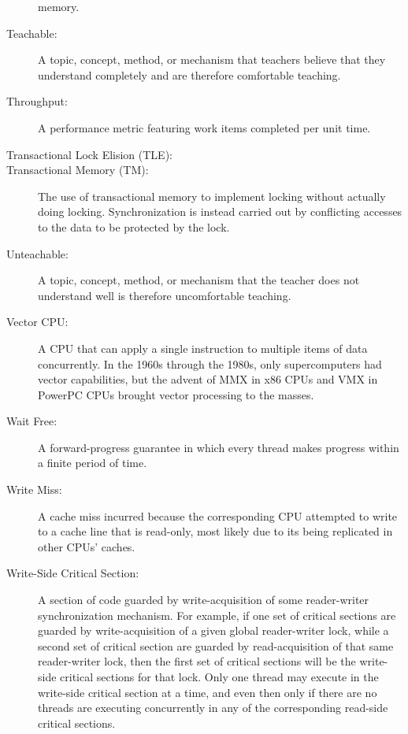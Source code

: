 \begin{description}
	memory.
\item[Teachable:]
	A topic, concept, method, or mechanism that teachers believe that
	they understand completely and are therefore comfortable teaching.
\item[Throughput:]
	A performance metric featuring work items completed per unit time.
\item[Transactional Lock Elision (TLE):]
\item[Transactional Memory (TM):]
	The use of transactional memory to implement locking without
	actually doing locking.
	Synchronization is instead carried out by conflicting accesses
	to the data to be protected by the lock.
\item[Unteachable:]
	A topic, concept, method, or mechanism that the teacher does
	not understand well is therefore uncomfortable teaching.
\item[Vector CPU:]
	A CPU that can apply a single instruction to multiple items of
	data concurrently.
	In the 1960s through the 1980s, only supercomputers had vector
	capabilities, but the advent of MMX in x86 CPUs and VMX in
	PowerPC CPUs brought vector processing to the masses.
\item[Wait Free:]
	A forward-progress guarantee in which every thread makes
	progress within a finite period of time.
\item[Write Miss:]
	A cache miss incurred because the corresponding CPU attempted
	to write to a cache line that is read-only, most likely due
	to its being replicated in other CPUs' caches.
\item[Write-Side Critical Section:]
	A section of code guarded by write-acquisition of
	some reader-writer synchronization mechanism.
	For example, if one set of critical sections are guarded by
	write-acquisition of
	a given global reader-writer lock, while a second set of critical
	section are guarded by read-acquisition of that same reader-writer
	lock, then the first set of critical sections will be the
	write-side critical sections for that lock.
	Only one thread may execute in the write-side critical section
	at a time, and even then only if there are no threads are
	executing concurrently in any of the corresponding read-side
	critical sections.
\end{description}
